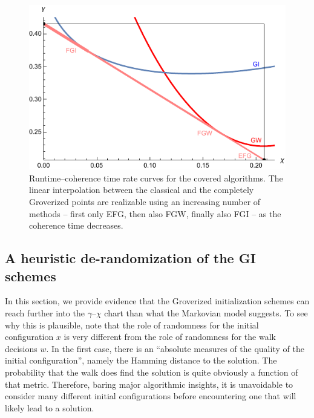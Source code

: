 \documentclass[a4paper,aps,floatfix]{revtex4}
\begin{document}
\begin{figure}[ht]
    \begin{center}
			\includegraphics[scale=.75]{images/all-tradeoffs}
    \end{center}
		\caption{\label{fig:all_tradeoffs} 
			Runtime--coherence time rate curves for the covered algorithms.
			The linear interpolation between the classical and the completely Groverized points are realizable using an increasing number of  methods -- first only EFG, then also FGW, finally also FGI -- as the coherence time decreases.
		}
\end{figure}


\subsection{A heuristic de-randomization of the GI schemes}

In this section, we provide evidence that the Groverized initialization schemes can reach further into the  $\gamma$--$\chi$ chart than what the Markovian model suggests.
To see why this is plausible,
note that the role of randomness for the initial configuration $x$ is very different from the role of randomness for the walk decisions $w$.
In the first case, there is an ``absolute measures of the quality of the initial configuration'', namely the Hamming distance to the solution.
The probability that the walk does find the solution is quite obviously a function of that metric.
Therefore, baring major algorithmic insights, it is unavoidable to consider many different initial configurations before encountering  one that will likely lead to a solution.
\end{document}
